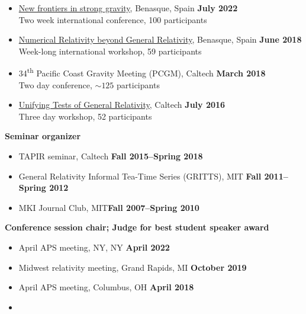 \documentclass[margin,line]{res}
\begin{document}
\begin{resume}
\begin{itemize}
		\item[]
		      \href{https://www.benasque.org/2022relativity/}
		      {New frontiers in strong gravity},
		      Benasque, Spain \hfill {\bf July 2022} \\
		      \hspace*{1em} Two week international conference, 100 participants
		\item[]
		      \href{http://www.benasque.org/2018relativity/}
		      {Numerical Relativity beyond General Relativity},
		      Benasque, Spain \hfill {\bf June 2018} \\
		      \hspace*{1em} Week-long international workshop, 59 participants
		\item[]
		      34\textsuperscript{th} Pacific Coast Gravity Meeting (PCGM),
		      Caltech
		      \hfill {\bf March 2018}\\
		      \hspace*{1em} Two day conference, $\sim 125$ participants
		\item[]
		      \href{http://www.tapir.caltech.edu/~unifying-gr-tests/}
		      {Unifying Tests of General Relativity},
		      Caltech \hfill {\bf July 2016} \\
		      \hspace*{1em} Three day workshop, 52 participants
	\end{itemize}
	{\bf Seminar organizer}
	\vspace*{.05in}
	\begin{itemize}
		\item[] TAPIR seminar, Caltech\hfill
		      {\bf Fall 2015--Spring 2018}
		\item[] General Relativity Informal Tea-Time Series (GRITTS), MIT\hfill
		      {\bf Fall 2011--Spring 2012}
		\item[] MKI Journal Club, MIT\hfill {\bf Fall 2007--Spring 2010}
	\end{itemize}
	{\bf Conference session chair; Judge for best student speaker award}
	\vspace*{.05in}
	\begin{itemize}
		\item[]
		      April APS meeting, NY, NY
		      \hfill {\bf April 2022}
		\item[]
		      Midwest relativity meeting, Grand Rapids, MI
		      \hfill {\bf October 2019}
		\item[]
		      April APS meeting, Columbus, OH
		      \hfill {\bf April 2018}
		\item[]

\end{itemize}
\end{resume}
\end{document}
